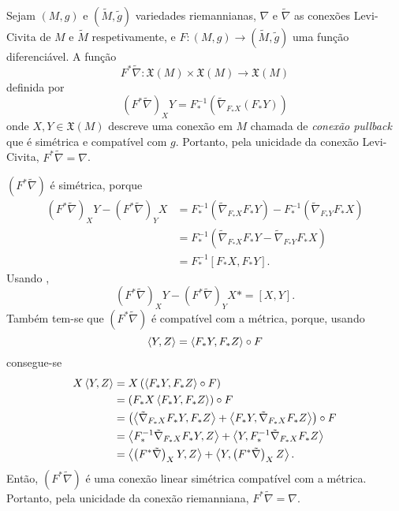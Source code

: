 \begin{proposicao}\label{conexao-pullback}
	Sejam $(M,g)$ e $(\tilde{M}, \tilde{g})$ variedades riemannianas, $\nabla$ e $\tilde{\nabla}$ as conexões Levi-Civita de $M$ e $\tilde{M}$ respetivamente, e $F: (M,g) \rightarrow (\tilde{M},\tilde{g})$ uma função diferenciável. A função
	\begin{equation*}
	F^* \tilde{\nabla}: \mathfrak{X}(M) \times \mathfrak{X}(M) \rightarrow \mathfrak{X}(M)
	\end{equation*}
	definida por
	\begin{equation*}
	\left( F^* \tilde{\nabla} \right)_X Y = F^{-1}_* \left( \tilde{\nabla}_{F_* X} (F_* Y) \right)
	\end{equation*}
	onde $X,Y \in \mathfrak{X}(M)$ descreve uma conexão em $M$ chamada de \emph{conexão pullback} que é simétrica e compatível com $g$. Portanto, pela unicidade da conexão Levi-Civita, $F^* \tilde{\nabla} = \nabla$.
\end{proposicao}

\begin{demonstracao}
	$(F^* \tilde{\nabla})$ é simétrica, porque
	\begin{align*}
		\left(F^* \tilde{\nabla}\right)_X Y - \left(F^* \tilde{\nabla}\right)_Y X &= F_*^{-1} \left(\tilde{\nabla}_{F_* X} F_*Y\right) - F_*^{-1} \left(\tilde{\nabla}_{F_* Y} F_* X\right)\\
		&= F_* ^{-1} \left(\tilde{\nabla}_{F_* X} F_*Y - \tilde{\nabla}_{F_* Y} F_* X\right)\\
		&= F_*^{-1} \left[F_*X, F_*Y\right].
	\end{align*}
	Usando \cite[Corollary 8.31]{Lee2012},
	\begin{equation*}
		\left(F^* \tilde{\nabla}\right)_X Y - \left(F^* \tilde{\nabla}\right)_Y X * = [X,Y].
	\end{equation*}
	Também tem-se que $(F^* \tilde{\nabla})$ é compatível com a métrica, porque, usando
	\begin{equation*}
		\left\langle Y,Z \right\rangle = \left\langle F_* Y,F_* Z \right\rangle \circ F		
	\end{equation*}
	consegue-se
	\begin{align*}
		X \left\langle Y,Z \right\rangle &= X \left(\left\langle F_* Y,F_* Z \right\rangle \circ F\right)\\
		&= \left(F_* X \left\langle F_* Y,F_* Z \right\rangle\right) \circ F\\
		&= \left(\left\langle \tilde{\nabla}_{F_* X} F_* Y,F_* Z \right\rangle + \left\langle F_* Y,\tilde{\nabla}_{F_* X} F_* Z \right\rangle\right) \circ F\\
		&= \left\langle F_*^{-1} \tilde{\nabla}_{F_* X} F_* Y,Z \right\rangle + \left\langle Y,F_*^{-1} \tilde{\nabla}_{F_* X} F_* Z \right\rangle\\
		&= \left\langle \left(F^* \tilde{\nabla}\right)_X Y,Z \right\rangle + \left\langle Y,\left(F^* \tilde{\nabla}\right)_X Z \right\rangle.
	\end{align*}
	Então, $(F^* \tilde{\nabla})$ é uma conexão linear simétrica compatível com a métrica. Portanto, pela unicidade da conexão riemanniana, $F^* \tilde{\nabla} = \nabla$.
\end{demonstracao}

